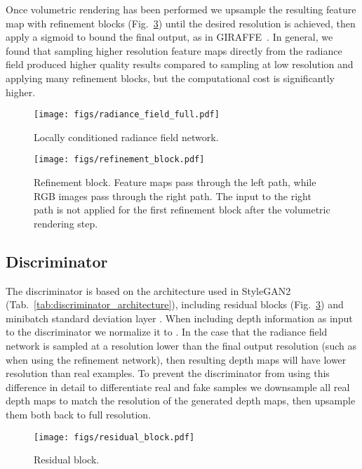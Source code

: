 \documentclass[10pt,twocolumn,letterpaper]{article}
\begin{document}
Once volumetric rendering has been performed we upsample the resulting feature map with refinement blocks (Fig.~\ref{fig:residual_block}) until the desired resolution is achieved, then apply a sigmoid to bound the final output, as in GIRAFFE~\cite{giraffe}. In general, we found that sampling higher resolution feature maps directly from the radiance field produced higher quality results compared to sampling at low resolution and applying many refinement blocks, but the computational cost is significantly higher.

\begin{figure}[h]
	\centering
	\texttt{[image: figs/radiance\_field\_full.pdf]}
	\caption{Locally conditioned radiance field network.}
	\label{fig:locally_conditioned_radiance_field_full}
\end{figure}

\begin{figure}[h]
	\centering
	\texttt{[image: figs/refinement\_block.pdf]}
	\caption{Refinement block. Feature maps pass through the left path, while RGB images pass through the right path. The input to the right path is not applied for the first refinement block after the volumetric rendering step.}
	\label{fig:refinement_block}
\end{figure}


\subsection{Discriminator}

The discriminator is based on the architecture used in StyleGAN2\cite{stylegan2} (Tab.~\ref{tab:discriminator_architecture}), including residual blocks (Fig.~\ref{fig:residual_block}) and minibatch standard deviation layer \cite{progan}. When including depth information as input to the discriminator we normalize it to . In the case that the radiance field network is sampled at a resolution lower than the final output resolution (such as when using the refinement network), then resulting depth maps will have lower resolution than real examples.
To prevent the discriminator from using this difference in detail to differentiate real and fake samples we downsample all real depth maps to match the resolution of the generated depth maps, then upsample them both back to full resolution. 

\begin{figure}[h]
	\centering
	\texttt{[image: figs/residual\_block.pdf]}
	\caption{Residual block.}
	\label{fig:residual_block}
\end{figure}
\end{document}
